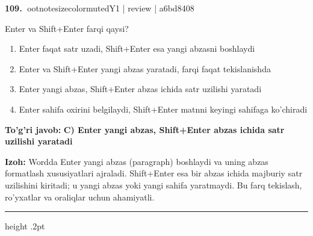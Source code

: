 \documentclass[10pt,a4paper]{article}
\begin{document}
\textbf{\color{ink}109.} {ootnotesizecolor{muted}Y1 | review | a6bd8408}
\par
Enter va Shift+Enter farqi qaysi?
\begin{enumerate}[label=\Alph*),leftmargin=9mm]
\item Enter faqat satr uzadi, Shift+Enter esa yangi abzasni boshlaydi
\item Enter va Shift+Enter yangi abzas yaratadi, farqi faqat tekislanishda
\item Enter yangi abzas, Shift+Enter abzas ichida satr uzilishi yaratadi
\item Enter sahifa oxirini belgilaydi, Shift+Enter matnni keyingi sahifaga ko'chiradi
\end{enumerate}
\begin{tcolorbox}[enhanced,breakable,colback=teal!4,colframe=teal!55!black,boxrule=0.45pt,arc=1.2mm,left=2.8mm,right=2.8mm,top=2mm,bottom=2mm]
\textbf{\color{teal}To'g'ri javob:} \textbf{C) Enter yangi abzas, Shift+Enter abzas ichida satr uzilishi yaratadi}
\par\smallskip
\textbf{Izoh:} Wordda Enter yangi abzas (paragraph) boshlaydi va uning abzas formatlash xususiyatlari ajraladi. Shift+Enter esa bir abzas ichida majburiy satr uzilishini kiritadi; u yangi abzas yoki yangi sahifa yaratmaydi. Bu farq tekislash, ro'yxatlar va oraliqlar uchun ahamiyatli.
\end{tcolorbox}
\vspace{2mm}\hrule height .2pt\vspace{2mm}
\end{document}
